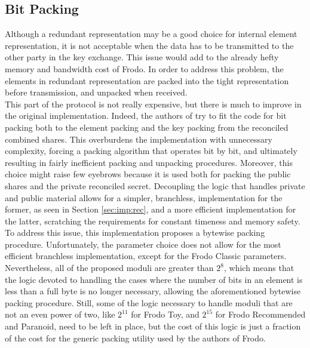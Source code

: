 \subsection{Bit Packing}
Although a redundant representation may be a good choice for internal element representation, it is not acceptable when the data has to be transmitted to the other party in the key exchange. This issue would add to the already hefty memory and bandwidth cost of Frodo. In order to address this problem, the elements in redundant representation are packed into the tight representation before transmission, and unpacked when received.\\
This part of the protocol is not really expensive, but there is much to improve in the original implementation. Indeed, the authors of \cite{frodo} try to fit the code for bit packing both to the element packing and the key packing from the reconciled combined shares. This overburdens the implementation with unnecessary complexity, forcing a packing algorithm that operates bit by bit, and ultimately resulting in fairly inefficient packing and unpacking procedures. Moreover, this choice might raise few eyebrows because it is used both for packing the public shares and the private reconciled secret. Decoupling the logic that handles private and public material allows for a simpler, branchless, implementation for the former, as seen in Section \ref{sec:imp:rec}, and a more efficient implementation for the latter, scratching the requirements for constant timeness and memory safety.\\
To address this issue, this implementation proposes a bytewise packing procedure. Unfortunately, the parameter choice does not allow for the most efficient branchless implementation, except for the Frodo Classic parameters. Nevertheless, all of the proposed moduli are greater than $2^8$, which means that the logic devoted to handling the cases where the number of bits in an element is less than a full byte is no longer necessary, allowing the aforementioned bytewise packing procedure. Still, some of the logic necessary to handle moduli that are not an even power of two, like $2^{11}$ for Frodo Toy, and $2^{15}$ for Frodo Recommended and Paranoid, need to be left in place, but the cost of this logic is just a fraction of the cost for the generic packing utility used by the authors of Frodo.

